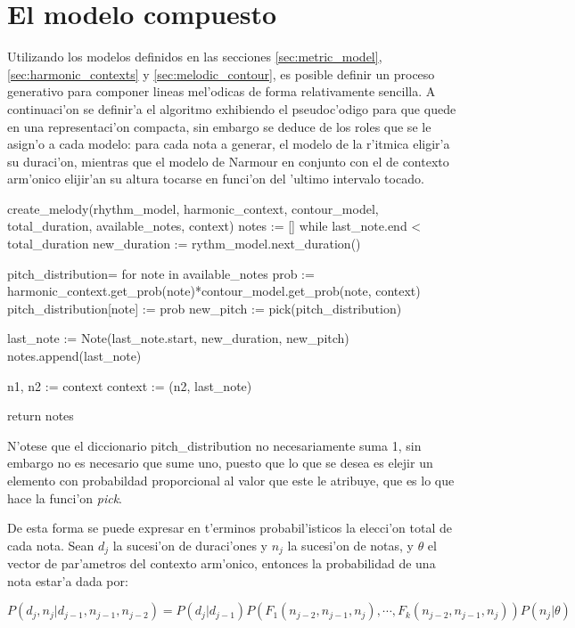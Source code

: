 \section{El modelo compuesto}
Utilizando los modelos definidos en las secciones \ref{sec:metric_model}, \ref{sec:harmonic_contexts} y \ref{sec:melodic_contour}, es posible definir
un proceso generativo para componer lineas mel'odicas de forma relativamente sencilla. 
A continuaci'on se definir'a el algoritmo exhibiendo el pseudoc'odigo para que quede en una representaci'on compacta, 
sin embargo se deduce de los roles que se le asign'o a cada modelo: 
para cada nota a generar, el modelo de la r'itmica eligir'a su duraci'on, mientras que el modelo de Narmour en conjunto con el de contexto arm'onico 
elijir'an su altura tocarse en funci'on del 'ultimo intervalo tocado.

\begin{algoritmo}
create_melody(rhythm_model, harmonic_context, contour_model, 
              total_duration, available_notes, context)
    notes := []
    while last_note.end < total_duration
        new_duration := rythm_model.next_duration()

        pitch_distribution= {}
        for note in available_notes
            prob := harmonic_context.get_prob(note)*contour_model.get_prob(note, context)
            pitch_distribution[note] := prob 
        new_pitch := pick(pitch_distribution)

        last_note := Note(last_note.start, new_duration, new_pitch)
        notes.append(last_note) 

        n1, n2 := context
        context := (n2, last_note)

    return notes
\end{algoritmo}

N'otese que el diccionario pitch\_distribution no necesariamente suma 1, sin embargo no es necesario que sume uno, puesto que lo que se desea es elejir un elemento con
probabildad proporcional al valor que este le atribuye, que es lo que hace la funci'on \emph{pick}.

De esta forma se puede expresar en t'erminos probabil'isticos la elecci'on total de cada nota. Sean $d_j$ la sucesi'on de duraci'ones y $n_j$ 
la sucesi'on de notas, y $\theta$ el vector de par'ametros del contexto arm'onico, entonces la probabilidad de una nota estar'a dada por:

$$P(d_j, n_j | d_{j-1}, n_{j-1}, n_{j-2}) = P(d_j|d_{j-1})P(F_1(n_{j-2}, n_{j-1}, n_j), \cdots, F_k(n_{j-2}, n_{j-1}, n_j)) P(n_j | \theta)$$

